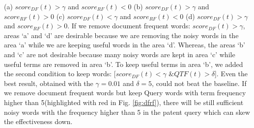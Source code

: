 \documentclass{sig-alternate}
\begin{document}
(a) $score_{DF}(t)>\gamma$ and $score_{RF}(t)<0$ 
(b) $score_{DF}(t)>\gamma$ and $score_{RF}(t)>0$ 
(c) $score_{DF}(t)<\gamma$ and $score_{RF}(t)<0$
(d) $score_{DF}(t)>\gamma$ and $score_{RF}(t)>0$. 
If we remove document frequent words: $score_{DF}(t)>\gamma$, areas `a' and `d' are desirable because we are removing the noisy words in the area `a' while we are keeping useful words in the area `d'.  Whereas, the areas `b' and `c' are not desirable because many noisy words are kept in area `c' while useful terms are removed in area `b'. To keep useful terms in area `b', we added the second condition to keep words: [$ score_{DF}(t)<\gamma \mbox{ \& } QTF(t)>\delta$]. Even the best result, obtained with the $ \gamma = 0.01 $ and $ \delta = 5 $, could not beat the baseline. If we remove document frequent words but keep Query words with term frequency higher than 5(highlighted with red in Fig. \ref{fig:dfrf}), there will be still sufficient noisy words with the frequency higher than 5 in the patent query which can skew the effectiveness down. 

\end{document}
